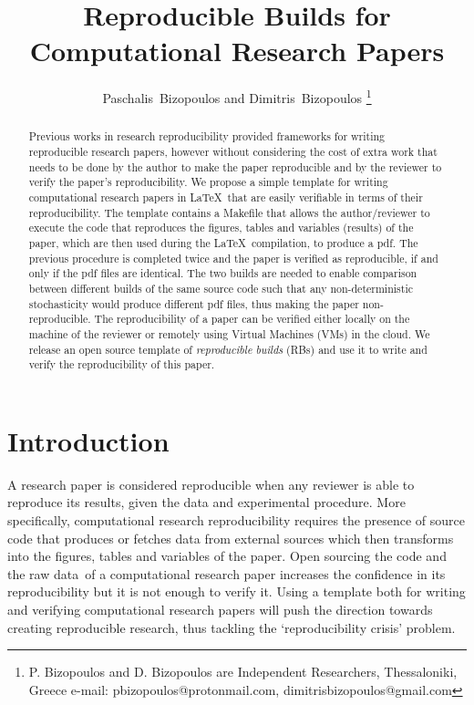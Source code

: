 \documentclass[journal]{IEEEtran}
\begin{document}

\title{Reproducible Builds for\\ Computational Research Papers}

\author{Paschalis~Bizopoulos and Dimitris~Bizopoulos
\thanks{P. Bizopoulos and D. Bizopoulos are Independent Researchers, Thessaloniki, Greece e-mail: pbizopoulos@protonmail.com, dimitrisbizopoulos@gmail.com}}

\maketitle

\begin{abstract}
	Previous works in research reproducibility provided frameworks for writing reproducible research papers, however without considering the cost of extra work that needs to be done by the author to make the paper reproducible and by the reviewer to verify the paper's reproducibility.
	We propose a simple template for writing computational research papers in \LaTeX\ that are easily verifiable in terms of their reproducibility.
	The template contains a Makefile that allows the author/reviewer to execute the code that reproduces the figures, tables and variables (results) of the paper, which are then used during the \LaTeX\ compilation, to produce a pdf.
	The previous procedure is completed twice and the paper is verified as reproducible, if and only if the pdf files are identical.
	The two builds are needed to enable comparison between different builds of the same source code such that any non-deterministic stochasticity would produce different pdf files, thus making the paper non-reproducible.
	The reproducibility of a paper can be verified either locally on the machine of the reviewer or remotely using Virtual Machines (VMs) in the cloud.
	We release an open source template of \textit{reproducible builds} (RBs) and use it to write and verify the reproducibility of this paper.
\end{abstract}

\section{Introduction}
A research paper is considered reproducible when any reviewer is able to reproduce its results, given the data and experimental procedure.
More specifically, computational research reproducibility requires the presence of source code that produces or fetches data from external sources which then transforms into the figures, tables and variables of the paper.
Open sourcing the code and the raw data of a computational research paper increases the confidence in its reproducibility but it is not enough to verify it.
Using a template both for writing and verifying computational research papers will push the direction towards creating reproducible research, thus tackling the `reproducibility crisis' problem.
\end{document}
